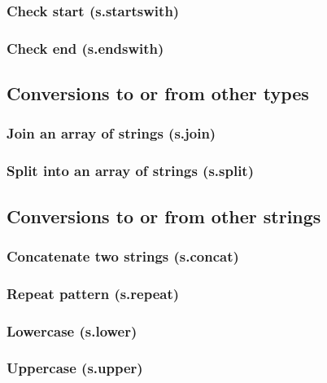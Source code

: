 \documentclass{article}
\theoremstyle{definition}
\begin{document}
\subsubsection{Check start (s.startswith)}

\subsubsection{Check end (s.endswith)}

\subsection{Conversions to or from other types}

\subsubsection{Join an array of strings (s.join)}

\subsubsection{Split into an array of strings (s.split)}

\subsection{Conversions to or from other strings}

\subsubsection{Concatenate two strings (s.concat)}

\subsubsection{Repeat pattern (s.repeat)}

\subsubsection{Lowercase (s.lower)}

\subsubsection{Uppercase (s.upper)}
\end{document}
